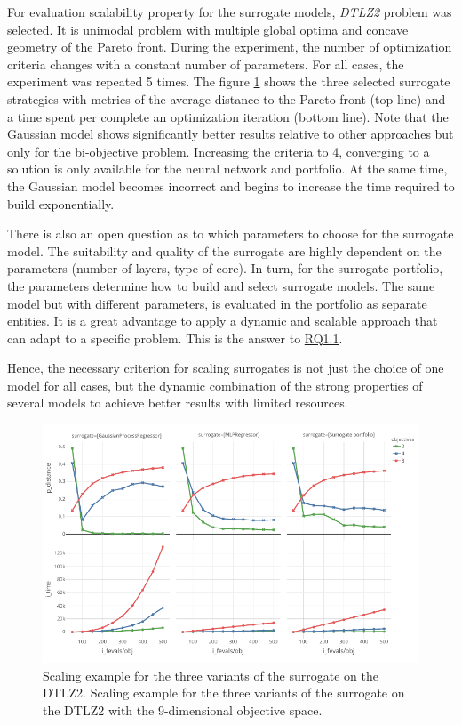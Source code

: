     For evaluation scalability property for the surrogate models, \emph{DTLZ2} problem was selected. It is unimodal problem with multiple global optima and concave geometry of the Pareto front. During the experiment, the number of optimization criteria changes with a constant number of parameters. For all cases, the experiment was repeated 5 times. The figure \ref{fig:scale_dtlz2} shows the three selected surrogate strategies with metrics of the average distance to the Pareto front (top line) and a time spent per complete an optimization iteration (bottom line). Note that the Gaussian model shows significantly better results relative to other approaches but only for the bi-objective problem. Increasing the criteria to 4, converging to a solution is only available for the neural network and portfolio. At the same time, the Gaussian model becomes incorrect and begins to increase the time required to build exponentially.
    
    There is also an open question as to which parameters to choose for the surrogate model. The suitability and quality of the surrogate are highly dependent on the parameters (number of layers, type of core). In turn, for the surrogate portfolio, the parameters determine how to build and select surrogate models. The same model but with different parameters, is evaluated in the portfolio as separate entities. It is a great advantage to apply a dynamic and scalable approach that can adapt to a specific problem. This is the answer to \hyperref[RQ1.1]{RQ1.1}.

    
    Hence, the necessary criterion for scaling surrogates is not just the choice of one model for all cases, but the dynamic combination of the strong properties of several models to achieve better results with limited resources.


    \begin{figure}
        \centering
        \includegraphics[width=\textwidth]{content/images/scale_dtlz2}
        \caption[Scaling example for the three variants of the surrogate on the DTLZ2.]{Scaling example for the three variants of the surrogate on the DTLZ2. Scaling example for the three variants of the surrogate on the DTLZ2  with the 9-dimensional objective space.}
        \label{fig:scale_dtlz2}    
    \end{figure}



